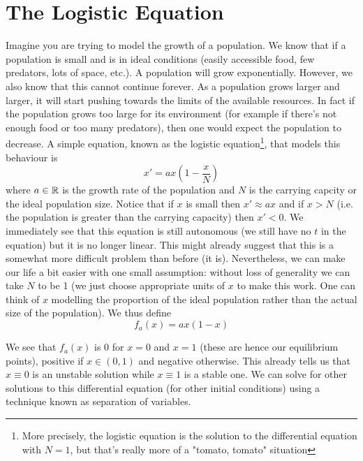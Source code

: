 \section{The Logistic Equation}\label{sec:logistic-eqn}

Imagine you are trying to model the growth of a population. We know that if a population is small and is in ideal conditions (easily accessible food, few predators, lots of space, etc.). A population will grow exponentially. However, we also know that this cannot continue forever. As a population grows larger and larger, it will start pushing towards the limits of the available resources. In fact if the population grows too large for its environment (for example if there's not enough food or too many predators), then one would expect the population to decrease. A simple equation, known as the logistic equation\footnote{More precisely, the logistic equation is the solution to the differential equation with $N = 1$, but that's really more of a "tomato, tomato" situation}, that models this behaviour is 
\begin{equation}
    x' = ax \left( 1 - \frac{x}{N} \right)
\end{equation}
where $a \in \mathbb{R}$ is the growth rate of the population and $N$ is the carrying capcity or the ideal population size. Notice that if $x$ is small then $x' \approx ax$ and if $x > N$ (i.e. the population is greater than the carrying capacity) then $x' < 0$. We immediately see that this equation is still autonomous (we still have no $t$ in the equation) but it is no longer linear. This might already suggest that this is a somewhat more difficult problem than before (it is). Nevertheless, we can make our life a bit easier with one small assumption: without loss of generality we can take $N$ to be 1 (we just choose appropriate units of $x$ to make this work. One can think of $x$ modelling the proportion of the ideal population rather than the actual size of the population). We thus define
\begin{equation}
    f_a(x) = ax(1 - x)
\end{equation}

We see that $f_a(x)$ is 0 for $x = 0$ and $x = 1$ (these are hence our equilibrium points), positive if $x \in (0, 1)$ and negative otherwise. This already tells us that $x \equiv 0$ is an unstable solution while $x \equiv 1$ is a stable one. We can solve for other solutions to this differential equation (for other initial conditions) using a technique known as separation of variables.

